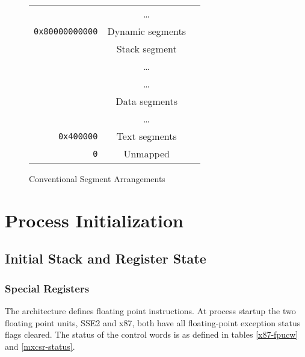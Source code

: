 \begin{figure}[H]
\Hrule
  \caption{Conventional Segment Arrangements}
  \label{fig-cfg}
  \begin{center}
    \begin{tabular}{r|c|l}
      \cline{2-2}
      & \dots & \\
      \verb|0x80000000000| & Dynamic segments & \\ \cline{2-2}
      & Stack segment & \\
      & \dots & \\ \cline{2-2}
      & \dots & \\
      & Data segments & \\ \cline{2-2}
      & \dots & \\
      \verb|0x400000| & Text segments & \\ \cline{2-2}
      \verb|0| & Unmapped & \\ \cline{2-2}
    \end{tabular}
  \end{center}
\Hrule
\end{figure}

\section{Process Initialization}

\subsection{Initial Stack and Register State}

\subsubsection{Special Registers}

The \xARCH architecture defines floating point instructions.  At
process startup the two floating point units, SSE2 and x87, both have
all floating-point exception status flags cleared.  The status of the
control words is as defined in tables \ref{x87-fpucw} and
\ref{mxcsr-status}.

